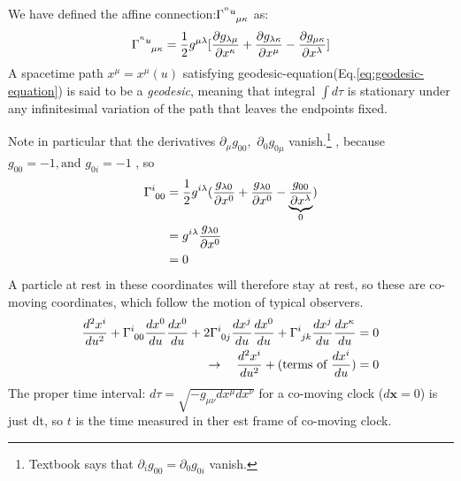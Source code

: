 \documentclass[11pt]{ltjsarticle}
\theoremstyle{plain}
\theoremstyle{break}
\newcommand{\mbfx}{\mathbf{x}}
\newcommand{\tensorGamma}[1]{\tensor{\Gamma}{ #1}}
\newcommand{\tensorg}[1]{\tensor{g}{ #1}}
\begin{document}
We have defined the affine connection:$\tensorGamma{^{^nu}_{\mu \kappa}}$ as:
\begin{align}
  \tensorGamma{^{^nu}_{\mu \kappa}} = \frac{1}{2}g^{\mu \lambda}[ \frac{\partial g_{\lambda \mu}}{\partial x^{\kappa}} + \frac{\partial g_{\lambda \kappa}}{\partial x^\mu} - \frac{\partial g_{\mu \kappa}}{\partial x^\lambda}] \label{eq:christoffel-symbols}
\end{align}
A spacetime path $x^\mu = x^\mu(u)$ satisfying geodesic-equation(Eq.\eqref{eq:geodesic-equation}) is said to be a \textit{geodesic}, meaning that integral $\int d\tau$ is stationary under any infinitesimal variation of the path that leaves the endpoints fixed.

Note in particular that the derivatives $\partial_\mu g_{00},\,\, \partial_0 g_{0\mu}$ vanish.\footnote{%
Textbook says that $\partial_i g_{00}= \partial_0 g_{0i}$ vanish. }%
, because $g_{00}=-1, \text{and} \,\, g_{0i}=-1$ , so
\begin{align}
  \tensorGamma{^i_{00}}
  &= \frac{1}{2}g^{i\lambda}(\frac{g_{\lambda 0}}{\partial x^0}+\frac{g_{\lambda 0}}{\partial x^0} - \underbrace{\frac{g_{00}}{\partial x^\lambda}}_{0}) \\
  &=\tensorg{^{i \lambda}}\frac{g_{\lambda 0}}{\partial x^0} \\
  &= 0
\end{align}
A particle at rest in these coordinates will therefore stay at rest, so these are co-moving coordinates, which follow the motion of typical observers.
\begin{align}
  \frac{d^2 x^{i}}{du^{2}} + \tensorGamma{^i_{00}}\frac{dx^0}{du}\frac{dx^0}{du}
  + 2 \tensorGamma{^i_{0j}}\frac{dx^j}{du}\frac{dx^0}{du}
  + \tensorGamma{^i_{jk}}\frac{dx^j}{du}\frac{dx^\kappa}{du} &= 0\\
  \rightarrow \quad \frac{d^2 x^{i}}{du^{2}} +( \text{terms of } \frac{dx^i}{du}) &=0
\end{align}
 The proper time interval: $d\tau = \sqrt{-g_{\mu\nu}dx^\mu dx^\nu}$ for a co-moving clock ($d\mbfx=0$) is just dt, so $t$ is the time measured in ther est frame of co-moving clock.
\end{document}
